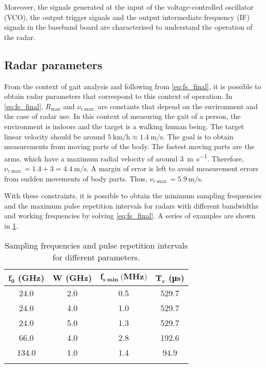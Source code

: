 Moreover, the signals generated at the input of the voltage-controlled oscillator (VCO), the output trigger signals and the output intermediate frequency (IF) signals in the baseband board are characterised to understand the operation of the radar.

\subsection{Radar parameters}

From the context of gait analysis and following from \cref{eq:fs_final}, it is possible to obtain radar parameters that correspond to this context of operation. In \cref{eq:fs_final}, $R_{\max}$ and $\nu_{r\max}$ are constants that depend on the environment and the case of radar use. In this context of measuring the gait of a person, the environment is indoors and the target is a walking human being. The target linear velocity should be around $\SI{5}{\kilo\meter\per\hour} \approx \SI{1.4}{\meter\per\second}$. The goal is to obtain measurements from moving parts of the body. The fastest moving parts are the arms, which have a maximum radial velocity of around \SI{3}{\meter\per\second}. Therefore, $\nu_{r\max} = 1.4 + 3 = \SI{4.4}{\meter\per\second}$. A margin of error is left to avoid measurement errors from sudden movements of body parts. Thus, $\nu_{r\max} =\SI{5.9}{\meter\per\second}$.

With these constraints, it is possible to obtain the minimum sampling frequencies and the maximum pulse repetition intervals for radars with different bandwidths and working frequencies by solving \cref{eq:fs_final}. A series of examples are shown in \cref{tab:fs_Tc}.

\begin{longtable}{@{}cccc@{}}
	\toprule
	$\mathbf{f_0}$ \textbf{(GHz)}& $\mathbf{W}$ \textbf{(GHz)} & $\mathbf{f_{s\min}} \textbf{(MHz)}$& $\mathbf{T_c}$ \textbf{(\si{\micro\second})} \\* \midrule
	\endhead
	24.0 & 2.0 & 0.5 & 529.7 \\
	24.0 & 4.0 & 1.0 & 529.7 \\
	24.0 & 5.0 & 1.3 & 529.7 \\
	66.0 & 4.0 & 2.8 & 192.6 \\
	134.0 & 1.0 & 1.4 & 94.9 \\* \bottomrule
	\caption{Sampling frequencies and pulse repetition intervals for different parameters.}
	\label{tab:fs_Tc}
\end{longtable}

